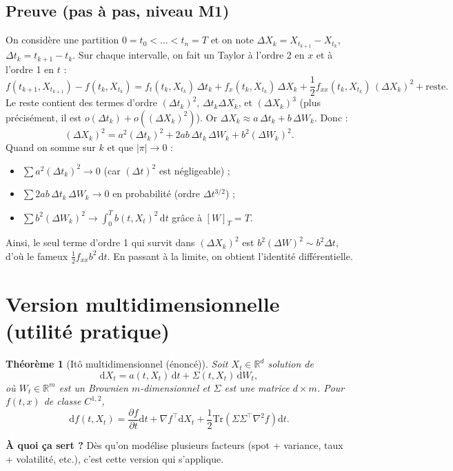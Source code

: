 \documentclass[11pt,a4paper]{report}
\newcommand{\dd}{\mathrm{d}}
\newcommand{\R}{\mathbb{R}}
\newcommand{\1}{\mathbbm{1}}
\newcommand{\pd}[2]{\frac{\partial #1}{\partial #2}}
\theoremstyle{definition}
\theoremstyle{plain}
\newtheorem{theorem}{Théorème}[chapter]
\theoremstyle{remark}
\begin{document}
\subsection{Preuve (pas à pas, niveau M1)}
On considère une partition $0=t_0<\dots<t_n=T$ et on note $\Delta X_k=X_{t_{k+1}}-X_{t_k}$, $\Delta t_k=t_{k+1}-t_k$.
Sur chaque intervalle, on fait un Taylor à l'ordre 2 en $x$ et à l'ordre 1 en $t$ :
\[
f(t_{k+1},X_{t_{k+1}})-f(t_k,X_{t_k})
=
f_t(t_k,X_{t_k})\,\Delta t_k
+ f_x(t_k,X_{t_k})\,\Delta X_k
+ \frac12 f_{xx}(t_k,X_{t_k})\,(\Delta X_k)^2
+ \text{reste}.
\]
Le reste contient des termes d'ordre $(\Delta t_k)^2$, $\Delta t_k \Delta X_k$, et $(\Delta X_k)^3$ (plus précisément, il est $o(\Delta t_k)+o((\Delta X_k)^2)$).
Or $\Delta X_k \approx a\,\Delta t_k + b\,\Delta W_k$.
Donc :
\[
(\Delta X_k)^2
= a^2(\Delta t_k)^2 + 2ab\,\Delta t_k\,\Delta W_k + b^2(\Delta W_k)^2.
\]
Quand on somme sur $k$ et que $|\pi|\to 0$ :
\begin{itemize}
  \item $\sum a^2(\Delta t_k)^2 \to 0$ (car $(\Delta t)^2$ est négligeable) ;
  \item $\sum 2ab\,\Delta t_k\,\Delta W_k \to 0$ en probabilité (ordre $\Delta t^{3/2}$) ;
  \item $\sum b^2 (\Delta W_k)^2 \to \int_0^T b(t,X_t)^2\,\dd t$ grâce à $[W]_T=T$.
\end{itemize}
Ainsi, le seul terme d'ordre 1 qui survit dans $(\Delta X_k)^2$ est $b^2(\Delta W)^2 \sim b^2 \Delta t$,
d'où le fameux $\tfrac12 f_{xx} b^2\,\dd t$.
En passant à la limite, on obtient l'identité différentielle.

\section{Version multidimensionnelle (utilité pratique)}
\label{sec:ito_multi}

\begin{theorem}[Itô multidimensionnel (énoncé)]
Soit $X_t\in\R^d$ solution de
\[
\dd X_t = a(t,X_t)\,\dd t + \Sigma(t,X_t)\,\dd W_t,
\]
où $W_t\in\R^m$ est un Brownien $m$-dimensionnel et $\Sigma$ est une matrice $d\times m$.
Pour $f(t,x)$ de classe $C^{1,2}$,
\[
\dd f(t,X_t)
=
\pd{f}{t}\dd t
+ \nabla f^\top \dd X_t
+ \frac12 \mathrm{Tr}\!\left(\Sigma \Sigma^\top \nabla^2 f\right)\dd t.
\]
\end{theorem}

\textbf{À quoi ça sert ?}
Dès qu'on modélise plusieurs facteurs (spot + variance, taux + volatilité, etc.), c'est cette version qui s'applique.
\end{document}
